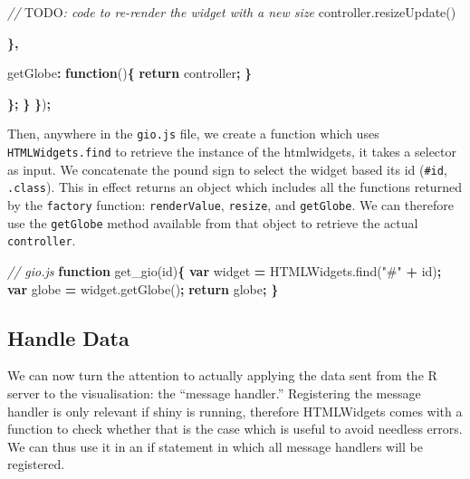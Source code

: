 \documentclass[
]{krantz}
\makeatletter
\newenvironment{Shaded}{\begin{snugshade}}{\end{snugshade}}
\newcommand{\AlertTok}[1]{\textcolor[rgb]{0.33,0.33,0.33}{#1}}
\newcommand{\AttributeTok}[1]{\textcolor[rgb]{0.61,0.61,0.61}{#1}}
\newcommand{\CommentTok}[1]{\textcolor[rgb]{0.37,0.37,0.37}{\textit{#1}}}
\newcommand{\ControlFlowTok}[1]{\textcolor[rgb]{0.27,0.27,0.27}{\textbf{#1}}}
\newcommand{\DataTypeTok}[1]{\textcolor[rgb]{0.27,0.27,0.27}{#1}}
\newcommand{\KeywordTok}[1]{\textcolor[rgb]{0.27,0.27,0.27}{\textbf{#1}}}
\newcommand{\NormalTok}[1]{#1}
\newcommand{\OperatorTok}[1]{\textcolor[rgb]{0.43,0.43,0.43}{\textbf{#1}}}
\newcommand{\StringTok}[1]{\textcolor[rgb]{0.5,0.5,0.5}{#1}}
\newcommand{\VariableTok}[1]{\textcolor[rgb]{0,0,0}{#1}}
\newenvironment{kframe}{%
\medskip{}
\setlength{\fboxsep}{.8em}
 \def\at@end@of@kframe{}%
 \ifinner\ifhmode%
  \def\at@end@of@kframe{\end{minipage}}%
  \begin{minipage}{\columnwidth}%
 \fi\fi%
 \def\FrameCommand##1{\hskip\@totalleftmargin \hskip-\fboxsep
 \colorbox{shadecolor}{##1}\hskip-\fboxsep
     \hskip-\linewidth \hskip-\@totalleftmargin \hskip\columnwidth}%
 \MakeFramed {\advance\hsize-\width
   \@totalleftmargin\z@ \linewidth\hsize
   \@setminipage}}%
 {\par\unskip\endMakeFramed%
 \at@end@of@kframe}
\renewenvironment{Shaded}{\begin{kframe}}{\end{kframe}}
\makeatother
\begin{document}
\begin{Shaded}
\begin{Highlighting}[]
        \CommentTok{// }\AlertTok{TODO}\CommentTok{: code to re{-}render the widget with a new size}
        \VariableTok{controller}\NormalTok{.}\AttributeTok{resizeUpdate}\NormalTok{()}

      \OperatorTok{\},}

      \DataTypeTok{getGlobe}\OperatorTok{:} \KeywordTok{function}\NormalTok{()}\OperatorTok{\{}
        \ControlFlowTok{return}\NormalTok{ controller}\OperatorTok{;}
      \OperatorTok{\}}

    \OperatorTok{\};}
  \OperatorTok{\}}
\OperatorTok{\}}\NormalTok{)}\OperatorTok{;}
\end{Highlighting}
\end{Shaded}

Then, anywhere in the \texttt{gio.js} file, we create a function which uses \texttt{HTMLWidgets.find} to retrieve the instance of the htmlwidgets, it takes a selector as input. We concatenate the pound sign to select the widget based its id (\texttt{\#id}, \texttt{.class}). This in effect returns an object which includes all the functions returned by the \texttt{factory} function: \texttt{renderValue}, \texttt{resize}, and \texttt{getGlobe}. We can therefore use the \texttt{getGlobe} method available from that object to retrieve the actual \texttt{controller}.

\begin{Shaded}
\begin{Highlighting}[]
\CommentTok{// gio.js}
\KeywordTok{function} \AttributeTok{get\_gio}\NormalTok{(id)}\OperatorTok{\{}
  \KeywordTok{var}\NormalTok{ widget }\OperatorTok{=} \VariableTok{HTMLWidgets}\NormalTok{.}\AttributeTok{find}\NormalTok{(}\StringTok{"\#"} \OperatorTok{+}\NormalTok{ id)}\OperatorTok{;}
  \KeywordTok{var}\NormalTok{ globe }\OperatorTok{=} \VariableTok{widget}\NormalTok{.}\AttributeTok{getGlobe}\NormalTok{()}\OperatorTok{;}
  \ControlFlowTok{return}\NormalTok{ globe}\OperatorTok{;}
\OperatorTok{\}}
\end{Highlighting}
\end{Shaded}

\hypertarget{shiny-widgets-handle-data}{%
\subsection{Handle Data}\label{shiny-widgets-handle-data}}

We can now turn the attention to actually applying the data sent from the R server to the visualisation: the ``message handler.'' Registering the message handler is only relevant if shiny is running, therefore HTMLWidgets comes with a function to check whether that is the case which is useful to avoid needless errors. We can thus use it in an if statement in which all message handlers will be registered.
\end{document}
